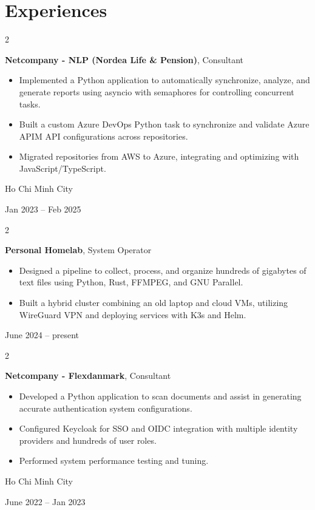 \documentclass[10pt, a4paper]{article}
\newenvironment{highlights}{
    \begin{itemize}[
        topsep=0.12 cm,
        parsep=0.10 cm,
        partopsep=0pt,
        itemsep=0pt,
        leftmargin=0.4 cm + 10pt
    ]
}{
    \end{itemize}
} %
\newenvironment{twocolentry}[2][]{
    \onecolentry
    \def\secondColumn{#2}
    \setcolumnwidth{\fill, 4.5 cm}
    \begin{paracol}{2}
}{
    \switchcolumn \raggedleft \secondColumn
    \end{paracol}
    \endonecolentry
} %
\begin{document}
    
    \section{Experiences}



        
        \begin{twocolentry}{
            Ho Chi Minh City

        Jan 2023 – Feb 2025
        }
            \textbf{Netcompany - NLP (Nordea Life \& Pension)}, Consultant
            \begin{highlights}
                \item Implemented a Python application to automatically synchronize, analyze, and generate reports using asyncio with semaphores for controlling concurrent tasks.
                \item Built a custom Azure DevOps Python task to synchronize and validate Azure APIM API configurations across repositories.
                \item Migrated repositories from AWS to Azure, integrating and optimizing with JavaScript/TypeScript.
            \end{highlights}
        \end{twocolentry}


        \vspace{0.2 cm}

        \begin{twocolentry}{
            June 2024 – present
        }
            \textbf{Personal Homelab}, System Operator
            \begin{highlights}
                \item Designed a pipeline to collect, process, and organize hundreds of gigabytes of text files using Python, Rust, FFMPEG, and GNU Parallel.
                \item Built a hybrid cluster combining an old laptop and cloud VMs, utilizing WireGuard VPN and deploying services with K3s and Helm.
            \end{highlights}
        \end{twocolentry}


        \vspace{0.2 cm}

        \begin{twocolentry}{
            Ho Chi Minh City

        June 2022 – Jan 2023
        }
            \textbf{Netcompany - Flexdanmark}, Consultant
            \begin{highlights}
                \item Developed a Python application to scan documents and assist in generating accurate authentication system configurations.
                \item Configured Keycloak for SSO and OIDC integration with multiple identity providers and hundreds of user roles.
                \item Performed system performance testing and tuning.
            \end{highlights}
        \end{twocolentry}
\end{document}
